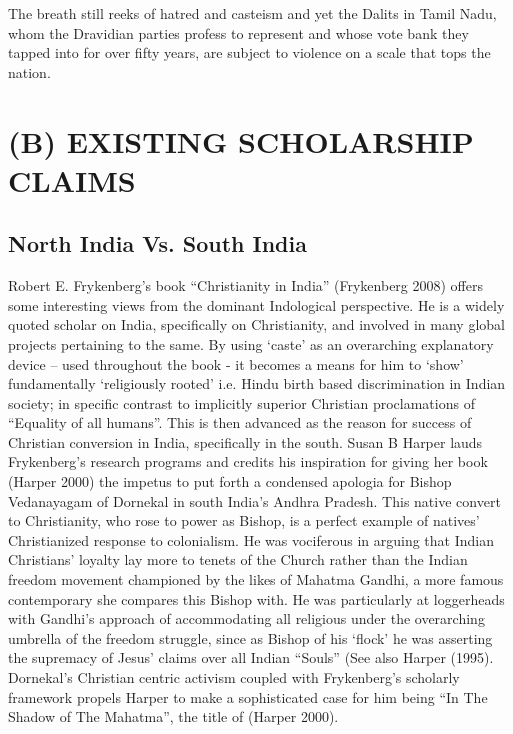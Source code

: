 The breath still reeks of hatred and casteism and yet the Dalits in Tamil Nadu, whom the Dravidian parties profess to represent and whose vote bank they tapped into for over fifty years, are subject to violence on a scale that tops the nation.

\vskip 2pt



\section*{(B) EXISTING SCHOLARSHIP CLAIMS}

\vskip 2pt

\subsection*{North India Vs. South India}

\vskip 2pt

Robert E. Frykenberg’s book “Christianity in India” (Frykenberg 2008) offers some interesting views from the dominant Indological perspective. He is a widely quoted scholar on India, specifically on Christianity, and involved in many global projects pertaining to the same. By using ‘caste’ as an overarching explanatory device – used throughout the book - it becomes a means for him to ‘show’ fundamentally ‘religiously rooted’ i.e. Hindu birth based discrimination in Indian society; in specific contrast to implicitly superior Christian proclamations of “Equality of all humans”. This is then advanced as the reason for success of Christian conversion in India, specifically in the south. Susan B Harper lauds Frykenberg’s research programs and credits his inspiration for giving her book (Harper 2000) the impetus to put forth a condensed apologia for Bishop Vedanayagam of Dornekal in south India’s Andhra Pradesh. This native convert to Christianity, who rose to power as Bishop, is a perfect example of natives’ Christianized response to colonialism. He was vociferous in arguing that Indian Christians’ loyalty lay more to tenets of the Church rather than the Indian freedom movement championed by the likes of Mahatma Gandhi, a more famous contemporary she compares this Bishop with. He was particularly at loggerheads with Gandhi’s approach of accommodating all religious under the overarching umbrella of the freedom struggle, since as Bishop of his ‘flock’ he was asserting the supremacy of Jesus’ claims over all Indian “Souls” (See also Harper (1995). Dornekal’s Christian centric activism coupled with Frykenberg’s scholarly framework propels Harper to make a sophisticated case for him being “In The Shadow of The Mahatma”, the title of (Harper 2000).

